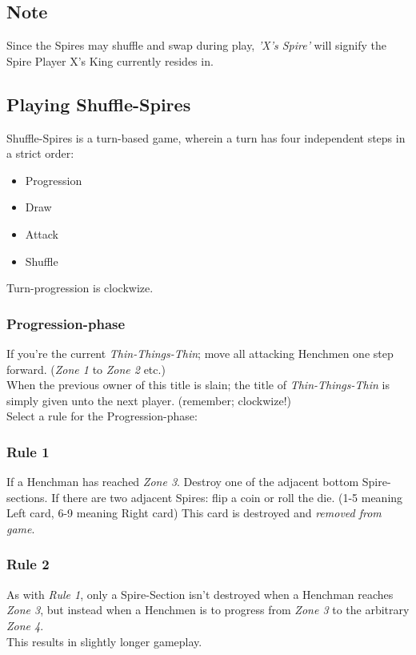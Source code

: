 \documentclass[11pt]{article} %
\begin{document}
\subsection{Note}
Since the Spires may shuffle and swap during play, \textit{'X's Spire'} will signify the Spire Player X's King currently resides in.

\subsection{Playing \textbf{Shuffle-Spires}}
Shuffle-Spires is a turn-based game, wherein a turn has four independent steps in a strict order:
\begin{itemize}
\renewcommand{\labelitemi}{$\bullet$}
\item  Progression
\item Draw
\item Attack
\item Shuffle
\end{itemize}
Turn-progression is clockwize.

\subsubsection{Progression-phase}
If you’re the current \textit{Thin-Things-Thin}; move all attacking Henchmen one step forward. (\textit{Zone 1} to \textit{Zone 2} etc.) \\
When the previous owner of this title is slain; the title of \textit{Thin-Things-Thin} is simply given unto the next player. (remember; clockwize!) \\
Select a rule for the Progression-phase:
\subsubsection{Rule 1}
If a Henchman has reached \textit{Zone 3}. Destroy one of the adjacent bottom Spire-sections. If there are two adjacent Spires: flip a coin or roll the die. (1-5 meaning Left card, 6-9 meaning Right card) This card is destroyed and \textit{removed from game}.
\subsubsection{Rule 2}
As with \textit{Rule 1}, only a Spire-Section isn’t destroyed when a Henchman reaches \textit{Zone 3}, but instead when a Henchmen is to progress from \textit{Zone 3} to the arbitrary \textit{Zone 4}. \\
This results in slightly longer gameplay. \\
\end{document}
